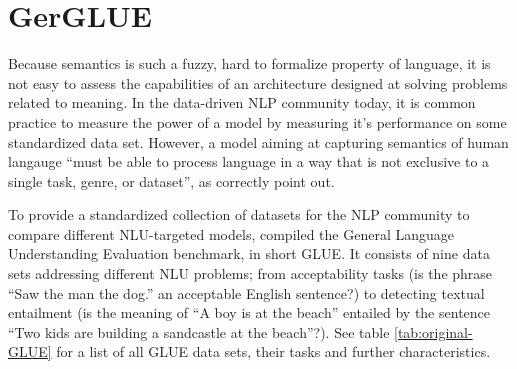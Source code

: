 \label{chap:3_datasets}


\section{GerGLUE}

Because semantics is such a fuzzy, hard to formalize property of language, it is not easy to
assess the capabilities of an architecture designed at solving problems related to meaning. In
the data-driven NLP community today, it is common practice to measure the {\color{red} power of
a model} by measuring it's performance on some standardized data set. However, a model aiming at
capturing semantics of human langauge ``must be able to process language in a way that is not
exclusive to a single task, genre, or dataset'', as \cite{wang2018glue} correctly point out.

To provide a standardized collection of datasets for the NLP community to compare different NLU-targeted
models, \citeauthor{wang2018glue} compiled the General Language Understanding Evaluation benchmark, in short
GLUE. It consists of nine data sets addressing different NLU problems; from acceptability
tasks (is the phrase ``Saw the man the dog.'' an acceptable English sentence?) to detecting
textual entailment (is the meaning of ``A boy is at the beach'' entailed by the sentence
``Two kids are building a sandcastle at the beach''?). See table \ref{tab:original-GLUE} for
a list of all GLUE data sets, their tasks and further characteristics.



